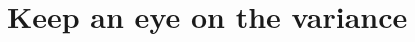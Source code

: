\documentclass[onlymath]{beamer}
\begin{document}
\section{Keep an eye on the variance}




\begin{comment}


\begin{frame}
	\begin{itemize}
		\item endliche Pfade (konkreter Startknoten, Menge von Zielknoten)
		\item Kantengewichte
		\begin{center}%
			\begin{tikzpicture}[auto,swap,scale=3]
			
			\foreach \pos/\name in {{(0,0)/1}, {(1,0)/3}, {(2,0)/4}, {(0,1)/2}}
			\node[vertex] (\name) at \pos {$\name$};
			
			\foreach \pos/\name in {{(1,1)/6}, {(2,1)/5}}
			\node[target] (\name) at \pos {$\name$};
			
			\foreach \source/ \dest /\weight in {
				1/2/{\frac{1}{2}:4},
				2/6/{1:2},
				5/6/{1:3},
				6/5/{1:7}
			}
			\path[edge] (\source) to[bend left] node[weight]{$\weight$} (\dest);
			
			\foreach \source/ \dest /\weight in {
				1/3/{\frac{1}{2}:5},
				3/4/{\frac{1}{2}:2},
				4/5/{\frac{1}{5}:3}
			}
			\path[edge] (\source) to[bend right] node{$\weight$} (\dest);
			
			\foreach \source/ \dest /\weight in {
				3/2/{\frac{1}{4}:5},
				3/5/{\frac{1}{4}:3}
			}
			\path[edge] (\source) to node[weight]{$\weight$} (\dest);
			
			\foreach \source/ \dest /\weight in {
				4/4/{\frac{4}{5}:2}
			}
			\path[edge] (\source) to[loop right] node[weight]{$\weight$} (\dest);
			
			\path[edge] (-0.5,0) to (1);
			
			\end{tikzpicture}
		\end{center}
		\pause		
		\item Berechnung von Varianzen akkumulierter Kantengewichte
		\item Literaturhinweis: Reward Variance in Markov Chains: A Calculational Approach (Tom Verhoeff, May 2004)
	\end{itemize}
\end{frame}


\end{comment}
\end{document}
